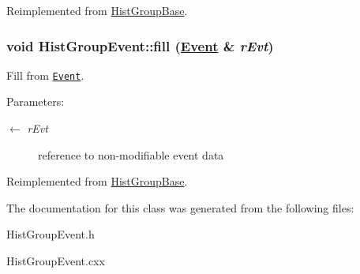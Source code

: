 Reimplemented from \hyperlink{classHistGroupBase_ea81dcbe971622e6c6f4f8c5bea582d2}{Hist\-Group\-Base}.\hypertarget{classHistGroupEvent_78f86b37c41ad91e5d14cfd082e64658}{
\subsubsection[fill]{\setlength{\rightskip}{0pt plus 5cm}void Hist\-Group\-Event::fill (\hyperlink{classEvent}{Event} \& {\em r\-Evt})}}
\label{classHistGroupEvent_78f86b37c41ad91e5d14cfd082e64658}


Fill from {\tt \hyperlink{classEvent}{Event}}. 

\begin{Desc}
\item[Parameters:]
\begin{description}
\item[\mbox{$\leftarrow$} {\em r\-Evt}]reference to non-modifiable event data \end{description}
\end{Desc}


Reimplemented from \hyperlink{classHistGroupBase_746a5fc493cc64c27e8274757034ecec}{Hist\-Group\-Base}.

The documentation for this class was generated from the following files:\begin{CompactItemize}
\item 
Hist\-Group\-Event.h\item 
Hist\-Group\-Event.cxx\end{CompactItemize}
